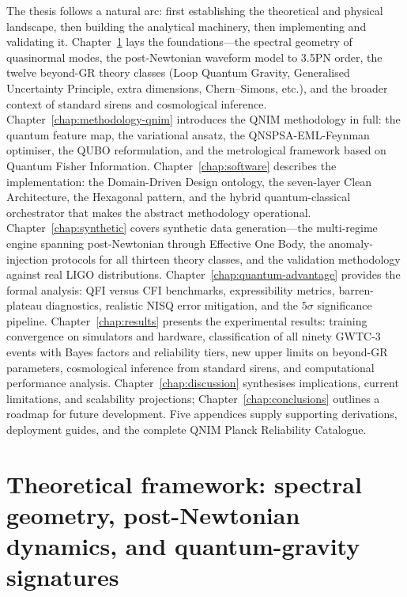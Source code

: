 \documentclass[11pt,a4paper, english]{book}
\theoremstyle{plain}
\theoremstyle{definition}
\numberwithin{equation}{chapter}
\numberwithin{figure}{chapter}
\numberwithin{table}{chapter}
\begin{document}
The thesis follows a natural arc: first establishing the theoretical and
physical landscape, then building the analytical machinery, then implementing
and validating it.
Chapter~\ref{chap:theoretical-framework} lays the foundations—the spectral
geometry of quasinormal modes, the post-Newtonian waveform model to 3.5PN
order, the twelve beyond-GR theory classes (Loop Quantum Gravity, Generalised
Uncertainty Principle, extra dimensions, Chern--Simons, etc.), and the broader
context of standard sirens and cosmological inference.
Chapter~\ref{chap:methodology-qnim} introduces the QNIM methodology in full:
the quantum feature map, the variational ansatz, the QNSPSA-EML-Feynman
optimiser, the QUBO reformulation, and the metrological framework based on
Quantum Fisher Information.
Chapter~\ref{chap:software} describes the implementation: the Domain-Driven
Design ontology, the seven-layer Clean Architecture, the Hexagonal pattern,
and the hybrid quantum-classical orchestrator that makes the abstract
methodology operational.
Chapter~\ref{chap:synthetic} covers synthetic data generation—the multi-regime
engine spanning post-Newtonian through Effective One Body, the
anomaly-injection protocols for all thirteen theory classes, and the
validation methodology against real LIGO distributions.
Chapter~\ref{chap:quantum-advantage} provides the formal analysis: QFI versus
CFI benchmarks, expressibility metrics, barren-plateau diagnostics, realistic
NISQ error mitigation, and the $5\sigma$ significance pipeline.
Chapter~\ref{chap:results} presents the experimental results: training
convergence on simulators and hardware, classification of all ninety GWTC-3
events with Bayes factors and reliability tiers, new upper limits on beyond-GR
parameters, cosmological inference from standard sirens, and computational
performance analysis.
Chapter~\ref{chap:discussion} synthesises implications, current limitations,
and scalability projections; Chapter~\ref{chap:conclusions} outlines a roadmap
for future development.
Five appendices supply supporting derivations, deployment guides, and the
complete QNIM Planck Reliability Catalogue.


\chapter{Theoretical framework: spectral geometry, post-Newtonian dynamics, and quantum-gravity signatures}
\label{chap:theoretical-framework}
\end{document}
